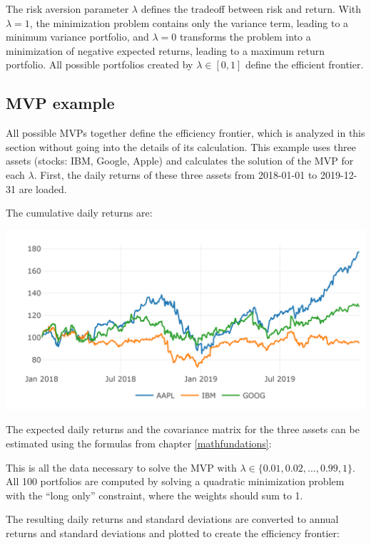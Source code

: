 \documentclass[
  oneside]{book}
\begin{document}
The risk aversion parameter \(\lambda\) defines the tradeoff between risk and return. With \(\lambda = 1\), the minimization problem contains only the variance term, leading to a minimum variance portfolio, and \(\lambda = 0\) transforms the problem into a minimization of negative expected returns, leading to a maximum return portfolio. All possible portfolios created by \(\lambda \in [0, 1]\) define the efficient frontier.

\hypertarget{mvp-example}{%
\subsection{MVP example}\label{mvp-example}}

All possible MVPs together define the efficiency frontier, which is analyzed in this section without going into the details of its calculation. This example uses three assets (stocks: IBM, Google, Apple) and calculates the solution of the MVP for each \(\lambda\). First, the daily returns of these three assets from 2018-01-01 to 2019-12-31 are loaded.

The cumulative daily returns are:

\includegraphics{Master_Thesis_files/figure-latex/MVP_ex2-1.png}

The expected daily returns and the covariance matrix for the three assets can be estimated using the formulas from chapter \ref{mathfundations}:

This is all the data necessary to solve the MVP with \(\lambda \in \{0.01, 0.02, ..., 0.99, 1\}\). All 100 portfolios are computed by solving a quadratic minimization problem with the ``long only'' constraint, where the weights should sum to 1.

The resulting daily returns and standard deviations are converted to annual returns and standard deviations and plotted to create the efficiency frontier:
\end{document}
